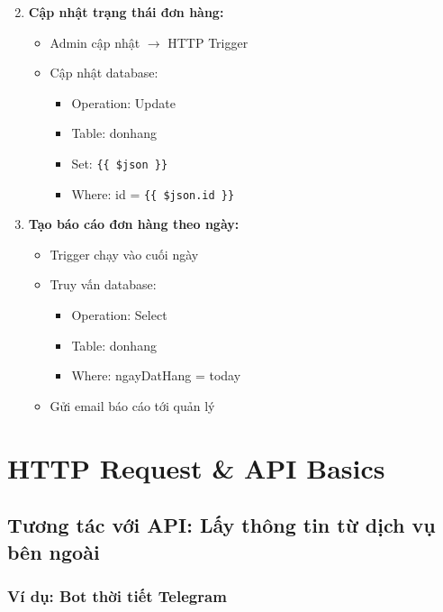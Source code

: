 \begin{enumerate}\setcounter{enumi}{1}
    \item \textbf{Cập nhật trạng thái đơn hàng:}
    \begin{itemize}
        \item Admin cập nhật $\rightarrow$ HTTP Trigger
        \item Cập nhật database:
        \begin{itemize}
            \item Operation: Update
            \item Table: donhang
            \item Set: \verb|{{ $json }}|
            \item Where: id = \verb|{{ $json.id }}|
        \end{itemize}
    \end{itemize}

    \item \textbf{Tạo báo cáo đơn hàng theo ngày:}
    \begin{itemize}
        \item Trigger chạy vào cuối ngày
        \item Truy vấn database:
        \begin{itemize}
            \item Operation: Select
            \item Table: donhang
            \item Where: ngayDatHang = today
        \end{itemize}
        \item Gửi email báo cáo tới quản lý
    \end{itemize}
\end{enumerate}

\section{HTTP Request \& API Basics}

\subsection{Tương tác với API: Lấy thông tin từ dịch vụ bên ngoài}

\subsubsection{Ví dụ: Bot thời tiết Telegram}

